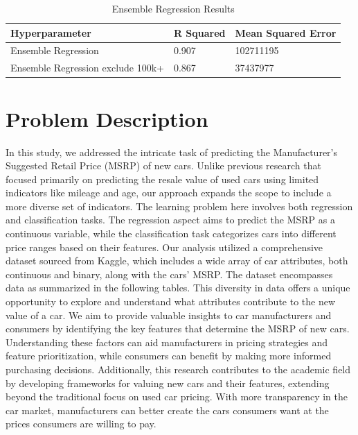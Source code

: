 \documentclass{article}
\begin{document}
\begin{table}[h]
\centering
\caption{Ensemble Regression Results}
\vspace{3pt}
\label{tab:hyperparameters}
\begin{tabular}{|l|l|l|}
\hline
\textbf{Hyperparameter} & \textbf{R Squared} & \textbf{Mean Squared Error} \\
\hline
Ensemble Regression & 0.907 & 102711195 \\
\hline
Ensemble Regression exclude 100k+ & 0.867 & 37437977 \\
\hline
\end{tabular}
\end{table}

\section{Problem Description}
In this study, we addressed the intricate task of predicting the Manufacturer's Suggested Retail Price (MSRP) of new cars. Unlike previous research that focused primarily on predicting the resale value of used cars using limited indicators like mileage and age, our approach expands the scope to include a more diverse set of indicators. The learning problem here involves both regression and classification tasks. The regression aspect aims to predict the MSRP as a continuous variable, while the classification task categorizes cars into different price ranges based on their features.
\newline
\newline
Our analysis utilized a comprehensive dataset sourced from Kaggle, which includes a wide array of car attributes, both continuous and binary, along with the cars' MSRP. The dataset encompasses data as summarized in the following tables. This diversity in data offers a unique opportunity to explore and understand what attributes contribute to the new value of a car.
\newline
\newline
We aim to provide valuable insights to car manufacturers and consumers by identifying the key features that determine the MSRP of new cars. Understanding these factors can aid manufacturers in pricing strategies and feature prioritization, while consumers can benefit by making more informed purchasing decisions. Additionally, this research contributes to the academic field by developing frameworks for valuing new cars and their features, extending beyond the traditional focus on used car pricing. With more transparency in the car market, manufacturers can better create the cars consumers want at the prices consumers are willing to pay.
\end{document}
